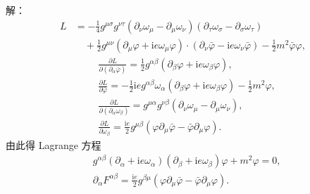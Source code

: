 \begin{enumerate}
解：\begin{align*}
L & =-\frac{1}{4} g^{\mu\sigma} g^{\nu \tau}(\partial_{\nu} \omega_{\mu}-\partial_{\mu} \omega_{\nu})(\partial_{\tau} \omega_{\sigma}-\partial_{\sigma} \omega_{\tau}) \\
& \quad +\frac{1}{2} g^{\mu\nu}(\partial_{\mu} \varphi+\mathrm{i} e \omega_{\mu} \varphi) \cdot(\partial_{\nu} \bar{\varphi}-\mathrm{i} e \omega_{\nu} \bar{\varphi})-\frac{1}{2} m^{2} \bar{\varphi} \varphi,
\end{align*}
\begin{align*}
& \frac{\partial L}{\partial\left(\partial_{\alpha} \bar{\varphi}\right)}=\frac{1}{2} g^{\alpha\beta}(\partial_{\beta} \varphi+\mathrm{i} e \omega_{\beta} \varphi), \\
& \frac{\partial L}{\partial \bar{\varphi}}=-\frac{1}{2} \mathrm{i} e g^{\alpha\beta} \omega_{\alpha}(\partial_{\beta} \varphi+\mathrm{i} e \omega_{\beta} \varphi)-\frac{1}{2} m^{2} \varphi, \\
& \frac{\partial L}{\partial(\partial_{\alpha} \omega_{\beta})}=g^{\mu\alpha} g^{\nu\beta}(\partial_{\nu} \omega_{\mu}-\partial_{\mu} \omega_{\nu}), \\
& \frac{\partial L}{\partial \omega_{\beta}}=\frac{\mathrm{i} e}{2} g^{\mu\beta}(\varphi \partial_{\mu} \bar{\varphi}-\bar{\varphi} \partial_{\mu} \varphi).
\end{align*}
由此得 Lagrange 方程
\begin{align*}
& g^{\alpha \beta}(\partial_{\alpha}+\mathrm{i} e \omega_{\alpha})(\partial_{\beta}+\mathrm{i} e \omega_{\beta}) \varphi+m^{2} \varphi=0, \\
& \partial_{\alpha} F^{\alpha\beta}=\frac{\mathrm{i} e}{2} g^{\beta\mu}(\varphi \partial_{\mu} \bar{\varphi}-\bar{\varphi} \partial_{\mu} \varphi).
\end{align*}
\end{enumerate}